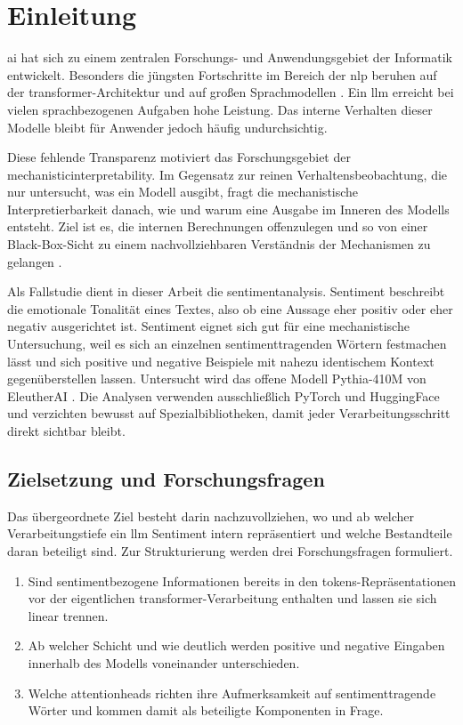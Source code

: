 \section{Einleitung}

\gls{ai} hat sich zu einem zentralen Forschungs- und Anwendungsgebiet der Informatik entwickelt. Besonders die jüngsten Fortschritte im Bereich der \gls{nlp} beruhen auf der \gls{transformer}-Architektur und auf großen Sprachmodellen \cite{vaswani2017attention, radford2018improving}. Ein \gls{llm} erreicht bei vielen sprachbezogenen Aufgaben hohe Leistung. Das interne Verhalten dieser Modelle bleibt für Anwender jedoch häufig undurchsichtig.

Diese fehlende Transparenz motiviert das Forschungsgebiet der \gls{mechanisticinterpretability}. Im Gegensatz zur reinen Verhaltensbeobachtung, die nur untersucht, was ein Modell ausgibt, fragt die mechanistische Interpretierbarkeit danach, wie und warum eine Ausgabe im Inneren des Modells entsteht. Ziel ist es, die internen Berechnungen offenzulegen und so von einer Black-Box-Sicht zu einem nachvollziehbaren Verständnis der Mechanismen zu gelangen \cite{nanda2023comprehensive, elhage2021mathematical}.

Als Fallstudie dient in dieser Arbeit die \gls{sentimentanalysis}. Sentiment beschreibt die emotionale Tonalität eines Textes, also ob eine Aussage eher positiv oder eher negativ ausgerichtet ist. Sentiment eignet sich gut für eine mechanistische Untersuchung, weil es sich an einzelnen sentimenttragenden Wörtern festmachen lässt und sich positive und negative Beispiele mit nahezu identischem Kontext gegenüberstellen lassen. Untersucht wird das offene Modell Pythia-410M von EleutherAI \cite{biderman2023pythia}. Die Analysen verwenden ausschließlich PyTorch und HuggingFace und verzichten bewusst auf Spezialbibliotheken, damit jeder Verarbeitungsschritt direkt sichtbar bleibt.

\subsection{Zielsetzung und Forschungsfragen}

Das übergeordnete Ziel besteht darin nachzuvollziehen, wo und ab welcher Verarbeitungstiefe ein \gls{llm} Sentiment intern repräsentiert und welche Bestandteile daran beteiligt sind. Zur Strukturierung werden drei Forschungsfragen formuliert.

\begin{enumerate}
  \item Sind sentimentbezogene Informationen bereits in den \glspl{token}-Repräsentationen vor der eigentlichen \gls{transformer}-Verarbeitung enthalten und lassen sie sich linear trennen.
  \item Ab welcher Schicht und wie deutlich werden positive und negative Eingaben innerhalb des Modells voneinander unterschieden.
  \item Welche \glspl{attentionhead} richten ihre Aufmerksamkeit auf sentimenttragende Wörter und kommen damit als beteiligte Komponenten in Frage.
\end{enumerate}

